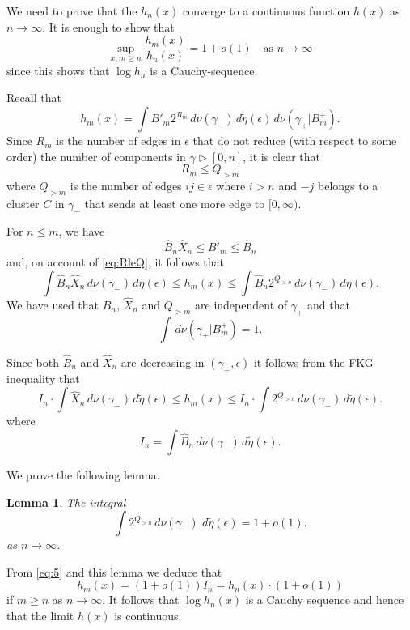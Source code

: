 \documentclass[11pt, a4paper]{amsart}
\newtheorem{lemma}[thm]{Lemma}
\theoremstyle{definition}
\theoremstyle{remark}
\renewcommand{\d}{\,d}
\providecommand{\e}{\epsilon}
\providecommand{\tl}{\tilde}
\providecommand{\g}{\gamma}
\begin{document}
We need to prove that the $h_n(x)$ converge to a continuous function $h(x)$ as
$n\to\infty$. It is enough to show that
$$ \sup_{x,m\ge n} \frac{h_m(x)}{h_n(x)} = 1 + o({1}) \quad\text{as $n\to\infty$}$$
since this shows that $\log h_n$ is a Cauchy-sequence.

Recall that
\begin{equation}\label{eq:3}
  h_m(x) =  \int B'_m 2^{R_m} \d \nu(\g_-)\d\tl\eta(\e) \d \nu(\g_+|B_m^+).
\end{equation}
Since $R_m$ is the number of edges in $\e$ that do not reduce (with respect to
some order) the number of components in $\g\triangleright [0,n]$, it is clear
that
\begin{equation}\label{eq:RleQ}
  R_m \le Q_{>m}
\end{equation}
where \(Q_{>m}\) is the number of edges $ij\in\e$ where $i>n$ and $-j$ belongs
to a cluster $C$ in $\g_-$ that sends at least one more edge to $[0,\infty)$.

For $n\le m$, we have
$$ \hat B_n \hat X_n \le B'_m \le \hat B_n $$
and, on account of \eqref{eq:RleQ}, it follows that
\begin{equation}\label{eq:4}
  \int \hat B_n \hat X_n \d \nu(\g_-) \d\tl\eta(\e)
  \le h_m(x) \le \int \hat B_n 2^{Q_{>n}} \d\nu(\g_-) \d\tl\eta(\e).
\end{equation}
We have used that $\hat B_n$, $\hat X_n$ and $Q_{>m}$ are independent of $\g_+$ and that
$$\int\d\nu(\g_+|B_m^+)=1. $$

Since both $\hat B_n$ and $\hat X_n$ are decreasing in $(\g_-,\e)$ it follows
from the FKG inequality that
\begin{equation}
  \label{eq:5}
  I_n \cdot \int \hat X_n \d\nu(\g_-) \d\tl\eta(\e)
  \le h_m(x)
  \le I_n \cdot \int 2^{Q_{>n}} \d\nu(\g_-) \d\tl\eta(\e).
\end{equation}
where
\begin{equation}
  \label{eq:6}
  I_n = \int \hat B_n \d\nu(\g_-) \d\tl\eta(\e).
\end{equation}

We prove the following lemma.
\begin{lemma}\label{lem:qn}
  The integral
  \[
    \int 2^{Q_{>n}} \d\nu(\g_-)\, \d\tilde\eta(\e) = 1+o(1).
  \]
  as $n\to\infty$.
\end{lemma}

From \eqref{eq:5} and this lemma we deduce that
\begin{equation}
  \label{eq:2}
  h_m(x) = (1+o(1)) I_n = h_n(x) \cdot (1+o(1))
\end{equation}
if $m\ge n$ as $n\to\infty$. It follows that $\log h_n(x)$ is a Cauchy sequence
and hence that the limit $h(x)$ is continuous.
\end{document}
